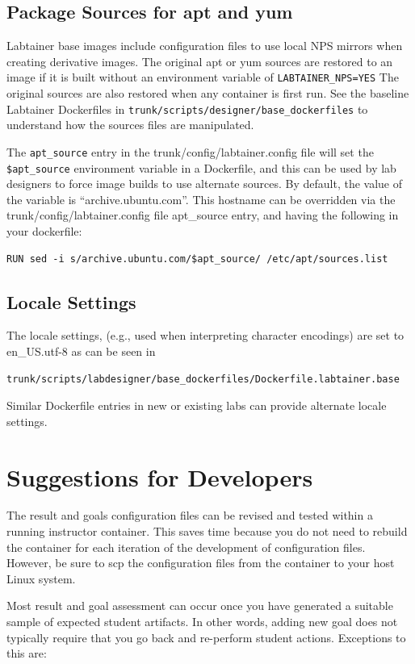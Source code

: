 \documentclass[12pt]{article}
\begin{document}
\subsection{Package Sources for apt and yum}
\label{package sources}
Labtainer base images include configuration files to use local NPS mirrors when creating derivative
images.  The original apt or yum sources are restored to an image if it is built without an environment
variable of {\tt LABTAINER\_NPS=YES}  The original sources are also restored when any container is first
run.  See the baseline Labtainer Dockerfiles in {\tt trunk/scripts/designer/base\_dockerfiles} to understand
how the sources files are manipulated.

The {\tt apt\_source} entry in the trunk/config/labtainer.config file will set the {\tt \$apt\_source}
environment variable in a Dockerfile, and this can be used by lab designers to force image builds to use
alternate sources.  By default, the value of the variable is ``archive.ubuntu.com''.  This hostname can be 
overridden via the trunk/config/labtainer.config file apt\_source entry, and having the following in your dockerfile:
\begin{verbatim}
RUN sed -i s/archive.ubuntu.com/$apt_source/ /etc/apt/sources.list
\end{verbatim}

\subsection{Locale Settings}
The locale settings, (e.g., used when interpreting character encodings) are set to en\_US.utf-8 
as can be seen in 
\begin{verbatim}
trunk/scripts/labdesigner/base_dockerfiles/Dockerfile.labtainer.base
\end{verbatim}
Similar Dockerfile entries in new or existing labs can provide alternate locale settings.

\section{Suggestions for Developers}
The result and goals configuration files can be revised and tested within a
running instructor container.  This saves time because you do not need to rebuild
the container for each iteration of the development of configuration files.  However,
be sure to scp the configuration files from the container to your host Linux system.

Most result and goal assessment can occur once you have generated a suitable sample of
expected student artifacts.  In other words, adding new goal does not typically require
that you go back and re-perform student actions.  Exceptions to this are:
\end{document}
